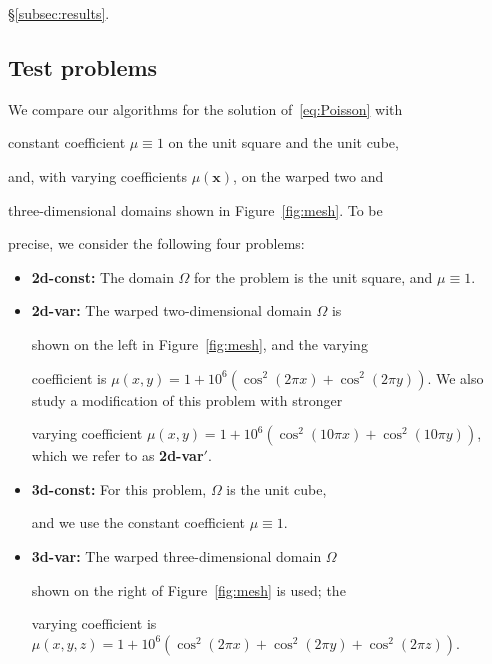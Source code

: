 \documentclass[smallcondensed,final]{svjour3}     %
\newcommand{\bs}[1]{\ensuremath{\boldsymbol #1}}
\begin{document}
\S\ref{subsec:results}.





\subsection{Test problems}\label{subsec:tests}

We compare our algorithms for the solution of~\eqref{eq:Poisson} with

constant coefficient $\mu\equiv 1$ on the unit square and the unit cube,

and, with varying coefficients $\mu(\bs x)$, on the warped two and

three-dimensional domains shown in Figure~\ref{fig:mesh}. To be

precise, we consider the following four problems:

\begin{itemize}

\item {\bf 2d-const:} The domain $\Omega$ for the problem is the unit square, and $\mu\equiv

  1$.

\item {\bf 2d-var:} The warped two-dimensional domain $\Omega$ is

  shown on the left in Figure~\ref{fig:mesh}, and the varying

  coefficient is $\mu(x,y) = 1 + 10^6(\cos^2(2\pi x) + \cos^2(2\pi

  y))$. We also study a modification of this problem with stronger

  varying coefficient $\mu(x,y) = 1 + 10^6(\cos^2(10\pi x) +

  \cos^2(10\pi y))$, which we refer to as {\bf 2d-var$'$}.

\item {\bf 3d-const:} For this problem, $\Omega$ is the unit cube,

  and we use the constant coefficient $\mu\equiv 1$.

\item {\bf 3d-var:} The warped three-dimensional domain $\Omega$

  shown on the right of Figure~\ref{fig:mesh} is used; the

  varying coefficient is $\mu(x,y,z) = 1 + 10^6(\cos^2(2\pi x) +

  \cos^2(2\pi y) + \cos^2(2\pi z))$.

\end{itemize}
\end{document}
